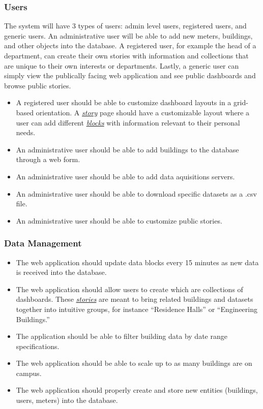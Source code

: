 \documentclass[onecolumn, draftclsnofoot,10pt, compsoc]{IEEEtran}
\begin{document}
    \subsubsection{Users}
    The system will have 3 types of users: admin level users, registered users, and generic users. An administrative user will be able to add new meters, buildings, and other objects into the database. A registered user, for example the head of a department, can create their own stories with information and collections that are unique to their own interests or departments. Lastly, a generic user can simply view the publically facing web application and see public dashboards and browse public stories. 
    \begin{itemize}
        \item A registered user should be able to customize dashboard layouts in a grid-based orientation. A \hyperref[definition]{\textit{story}} page should have a customizable layout where a user can add different \hyperref[definition]{\textit{blocks}} with information relevant to their personal needs.
        \item An administrative user should be able to add buildings to the database through a web form.
        \item An administrative user should be able to add data aquisitions servers.
        \item An administrative user should be able to download specific datasets as a .csv file.
        \item An administrative user should be able to customize public stories.
    \end{itemize}

    \subsubsection{Data Management}
    \begin{itemize}
        \item The web application should update data blocks every 15 minutes as new data is received into the database.
        \item The web application should allow users to create  which are collections of dashboards. These 
        \hyperref[definition]{\textit{stories}} are meant to bring related buildings and datasets together into intuitive groups, for instance ``Residence Halls'' or ``Engineering Buildings.''
        \item The application should be able to filter building data by date range specifications.
        \item The web application should be able to scale up to as many buildings are on campus.
        \item The web application should properly create and store new entities (buildings, users, meters) into the database.
        
    \end{itemize}    
\end{document}
